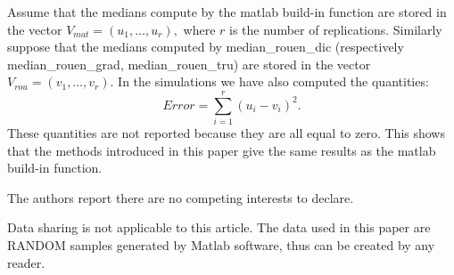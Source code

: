 \documentclass[
  11pt,
  a4paper,
]{article}
\begin{document}
Assume that the medians compute by the matlab build-in function are stored in the vector
$V_{mat}=(u_1,\ldots,u_r),$ where $r$ is the number of replications. Similarly suppose that
the medians computed by median\_rouen\_dic (respectively median\_rouen\_grad, median\_rouen\_tru) are stored in the
vector $V_{rou}=(v_1,\ldots,v_r).$ In the simulations we have also computed the quantities:
\[
Error=\sum_{i=1}^{r} (u_i-v_i)^2.
\]
These quantities are not reported because they are all equal to zero. This shows that the methods introduced in this paper
give the same results as the matlab build-in function.

The authors report there are no competing interests to declare.

Data sharing is not applicable to this article. The data used in this
paper are RANDOM samples generated by Matlab software, thus can be
created by any reader.
\end{document}
